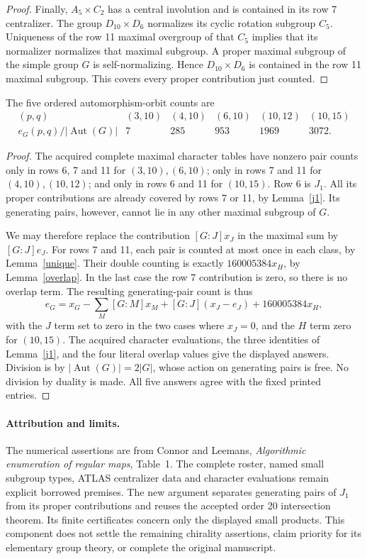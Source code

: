 \documentclass[11pt,a4paper]{article}
\begin{document}
\begin{proof}
Finally, $A_5\times C_2$ has a central involution and is contained
in its row 7 centralizer. The group $D_{10}\times D_6$ normalizes
its cyclic rotation subgroup $C_5$. Uniqueness of the row 11
maximal overgroup of that $C_5$ implies that its normalizer
normalizes that maximal subgroup. A proper maximal subgroup of
the simple group $G$ is self-normalizing. Hence
$D_{10}\times D_6$ is contained in the row 11 maximal subgroup.
This covers every proper contribution just counted.
\end{proof}

\begin{theorem}
The five ordered automorphism-orbit counts are
\[
\begin{array}{c|rrrrr}
(p,q)&(3,10)&(4,10)&(6,10)&(10,12)&(10,15)\\\hline
 e_G(p,q)/|\operatorname{Aut}(G)|&7&285&953&1969&3072.
\end{array}
\]
\end{theorem}
\begin{proof}
The acquired complete maximal character tables have nonzero pair
counts only in rows 6, 7 and 11 for $(3,10),(6,10)$; only in rows 7
and 11 for $(4,10),(10,12)$; and only in rows 6 and 11 for $(10,15)$.
Row 6 is $J_1$. All its proper contributions are already covered by
rows 7 or 11, by Lemma~\ref{j1}. Its generating pairs, however,
cannot lie in any other maximal subgroup of $G$.

We may therefore replace the contribution $[G:J]x_J$ in the maximal
sum by $[G:J]e_J$. For rows 7 and 11, each pair is counted at most
once in each class, by Lemma~\ref{unique}. Their double counting
is exactly $160005384x_H$, by Lemma~\ref{overlap}. In the last case
the row 7 contribution is zero, so there is no overlap term.
The resulting generating-pair count is thus
\[
 e_G=x_G-\sum_M[G:M]x_M
     +[G:J](x_J-e_J)+160005384x_H,
\]
with the $J$ term set to zero in the two cases where $x_J=0$, and
the $H$ term zero for $(10,15)$. The acquired character evaluations,
the three identities of Lemma~\ref{j1}, and the four literal overlap
values give the displayed answers. Division is by
$|\operatorname{Aut}(G)|=2|G|$, whose action on generating pairs is
free. No division by duality is made. All five answers agree with
the fixed printed entries.
\end{proof}

\paragraph{Attribution and limits.}
The numerical assertions are from Connor and Leemans,
\emph{Algorithmic enumeration of regular maps}, Table~1. The complete
roster, named small subgroup types, ATLAS centralizer data and
character evaluations remain explicit borrowed premises. The new
argument separates generating pairs of $J_1$ from its proper
contributions and reuses the accepted order 20 intersection theorem.
Its finite certificates concern only the displayed small products.
This component does not settle the remaining chirality assertions,
claim priority for its elementary group theory, or complete the
original manuscript.
\end{document}
